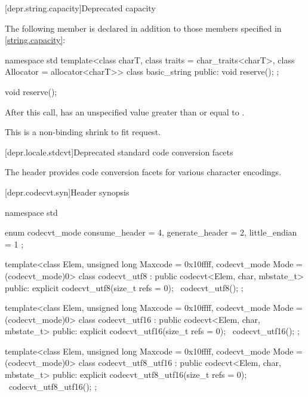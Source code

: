 [depr.string.capacity]{Deprecated  capacity}

\pnum
The following member is declared in addition to those members specified
in \ref{string.capacity}:

%
\begin{codeblock}
namespace std {
  template<class charT, class traits = char_traits<charT>,
           class Allocator = allocator<charT>>
  class basic_string {
  public:
    void reserve();
  };
}
\end{codeblock}

%
\begin{itemdecl}
void reserve();
\end{itemdecl}

\begin{itemdescr}
\pnum\effects
After this call,  has an unspecified value
greater than or equal to .
\begin{note} This is a non-binding shrink to fit request. \end{note}
\end{itemdescr}

[depr.locale.stdcvt]{Deprecated standard code conversion facets}

\pnum
{}%
The header  provides code conversion facets for various character encodings.

[depr.codecvt.syn]{Header  synopsis}

%
%
%
%
\begin{codeblock}
namespace std {
  enum codecvt_mode {
    consume_header = 4,
    generate_header = 2,
    little_endian = 1
  };

  template<class Elem, unsigned long Maxcode = 0x10ffff, codecvt_mode Mode = (codecvt_mode)0>
    class codecvt_utf8 : public codecvt<Elem, char, mbstate_t> {
    public:
      explicit codecvt_utf8(size_t refs = 0);
      ~codecvt_utf8();
    };

  template<class Elem, unsigned long Maxcode = 0x10ffff, codecvt_mode Mode = (codecvt_mode)0>
    class codecvt_utf16 : public codecvt<Elem, char, mbstate_t> {
    public:
      explicit codecvt_utf16(size_t refs = 0);
      ~codecvt_utf16();
    };

  template<class Elem, unsigned long Maxcode = 0x10ffff, codecvt_mode Mode = (codecvt_mode)0>
    class codecvt_utf8_utf16 : public codecvt<Elem, char, mbstate_t> {
    public:
      explicit codecvt_utf8_utf16(size_t refs = 0);
      ~codecvt_utf8_utf16();
    };
}
\end{codeblock}

